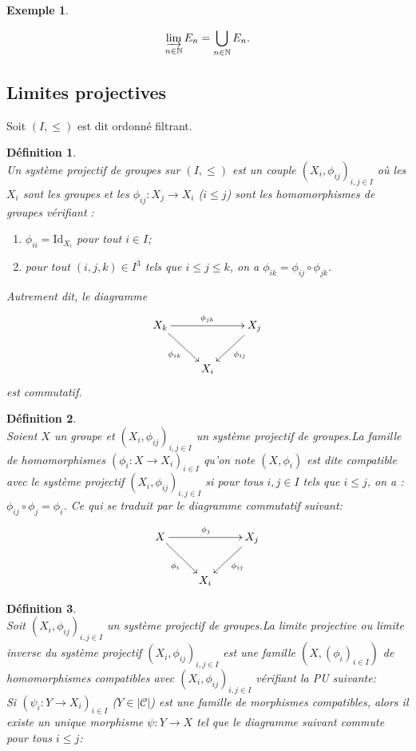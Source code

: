 \documentclass[a4paper, 14pt]{report}
\newtheorem{definition}{Définition}[section]
\newtheorem{example}{Exemple}[section]
\begin{document}
\begin{onehalfspace}
{\begin{example}
\begin{enumerate}
					\[
					\varinjlim_{n \in \mathbb{N}} E_n = \bigcup_{n \in \mathbb{N}} E_n.
					\]
				\end{enumerate}
			\end{example}
			
			
			\subsection{Limites projectives}
			Soit $(I,\leq)$ est dit ordonné filtrant.
			\begin{definition} \cite{maclane1971categories}\\
				Un système projectif de groupes sur $(I,\leq)$ est un couple $(X_{i},\phi_{ij})_{i,j \in I}$ où les $X_{i}$ sont les groupes et les $\phi_{ij}:X_{j} \rightarrow X_{i}$  ($i \leq j$) sont les homomorphismes de groupes vérifiant :
				\begin{enumerate}[label=\roman*)]
					\item $\phi_{ii} = \text{Id}_{X_{i}}$ pour tout $i \in I$;
					\item pour tout $(i,j,k) \in I^{3}$ tels que $i \leq j \leq k$, on a $\phi_{ik} = \phi_{ij} \circ \phi_{jk}$.
				\end{enumerate}
				Autrement dit, le diagramme
				\[
				\xymatrix{
					X_{k} \ar[rr]^{\phi_{jk}} \ar[dr]_{\phi_{ik}} & & X_{j} \ar[dl]^{\phi_{ij}} \\
					& X_{i} &
				}
				\]
				est commutatif.
			\end{definition}
			
			
			\begin{definition}  \cite{maclane1971categories}\\
				Soient $X$ un groupe et $(X_{i}, \phi_{ij})_{i,j \in I}$ un système projectif de groupes.La famille de homomorphismes $(\phi_{i} : X \rightarrow X_{i})_{i \in I}$ qu'on note $( X ,\phi_{i})$ est dite compatible avec le système projectif $(X_{i}, \phi_{ij})_{i,j \in I}$ si pour tous $i,j \in I$ tels que $i \leq j$, on a : $\phi_{ij} \circ \phi_{j} = \phi_{i}$.
				Ce qui se traduit par le diagramme commutatif suivant:
				\[
				\xymatrix{
					X \ar[rr]^{\phi_{j}} \ar[dr]_{\phi_{i}} & & X_{j} \ar[dl]^{\phi_{ij}} \\
					& X_{i} &
				}
				\]
				
			\end{definition}
			
			\begin{definition}  \cite{maclane1971categories}\\
				Soit $(X_{i},\phi_{ij})_{i,j \in I}$ un système projectif de groupes.La limite projective ou limite inverse du système projectif $(X_{i},\phi_{ij})_{i,j \in I}$  est une famille $(X,(\phi_{i})_{i \in I})$ de homomorphismes compatibles avec $(X_{i},\phi_{ij})_{i,j \in I}$ vérifiant la PU suivante: \\
				Si $(\psi _{i} : Y \rightarrow X_{i})_{i \in I}$ ($ Y \in |\mathcal{C}|$) est une famille de morphismes compatibles, alors il existe un unique morphisme $\psi : Y \rightarrow X $ tel que le diagramme suivant commute pour tous $i \leq j$:
				

\end{definition}}
\end{onehalfspace}
\end{document}
